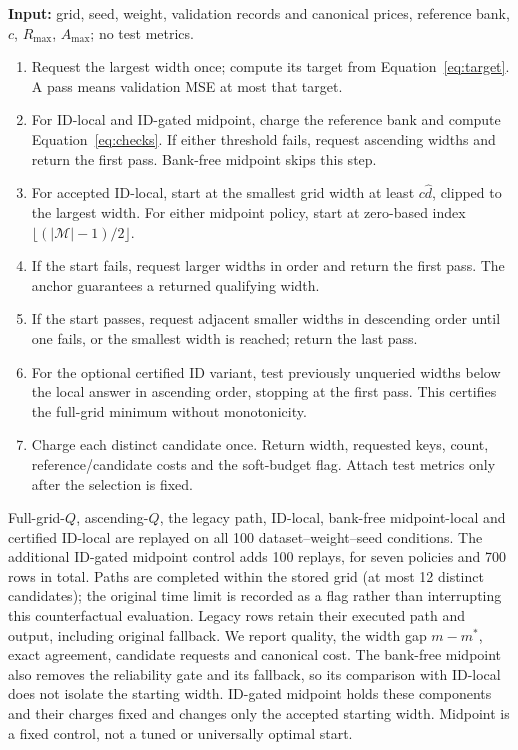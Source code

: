 \documentclass[make,article,submit,pdftex,moreauthors]{Definitions/mdpi}
\begin{document}
\medskip\noindent\begin{minipage}{\linewidth}
\begin{Algorithm}
\label{alg:replay}\normalfont\small\leavevmode\par\noindent
\textbf{Input:} grid, seed, weight, validation records and canonical prices,
reference bank, $c$, $R_{\max}$, $A_{\max}$; no test metrics.
\begin{enumerate}
\item Request the largest width once; compute its target from
Equation~\ref{eq:target}. A pass means validation MSE at most that target.
\item For ID-local and ID-gated midpoint, charge the reference bank and
compute Equation~\ref{eq:checks}. If either threshold fails, request
ascending widths and return the first pass. Bank-free midpoint skips this step.
\item For accepted ID-local, start at the smallest grid width at least
$c\hat d$, clipped to the largest width. For either midpoint policy,
start at zero-based index $\lfloor(|\mathcal M|-1)/2\rfloor$.

\item If the start fails, request larger widths in order and return the
first pass. The anchor guarantees a returned qualifying width.
\item If the start passes, request adjacent smaller widths in descending
order until one fails, or the smallest width is reached; return the last pass.
\item For the optional certified ID variant, test previously unqueried
widths below the local answer in ascending order, stopping at the first
pass. This certifies the full-grid minimum without monotonicity.
\item Charge each distinct candidate once. Return width, requested keys,
count, reference/candidate costs and the soft-budget flag. Attach test
metrics only after the selection is fixed.
\end{enumerate}
\end{Algorithm}
\end{minipage}\medskip

Full-grid-$Q$, ascending-$Q$, the legacy path, ID-local, bank-free
midpoint-local and certified ID-local are replayed on all 100
dataset--weight--seed conditions. The additional ID-gated midpoint
control adds 100 replays, for seven policies and 700 rows in total. Paths are completed within the stored grid (at most 12
distinct candidates); the original time limit is recorded as a flag
rather than interrupting this counterfactual evaluation. Legacy rows
retain their executed path and output, including original fallback.
We report quality, the width gap $m-m^*$, exact agreement, candidate
requests and canonical cost. The bank-free midpoint also removes the
reliability gate and its fallback, so its comparison with ID-local does
not isolate the starting width. ID-gated midpoint holds these components
and their charges fixed and changes only the accepted starting width.
Midpoint is a fixed control, not a tuned or universally optimal start.
\end{document}
